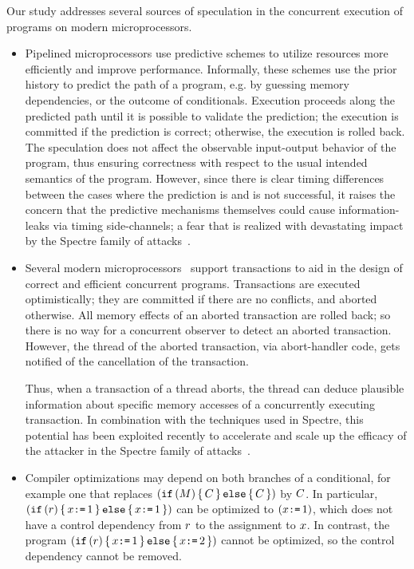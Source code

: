 Our study addresses several sources of speculation in the concurrent
execution of programs on modern microprocessors.
\begin{itemize}

\item Pipelined microprocessors use predictive schemes to utilize
  resources more efficiently and improve performance. Informally,
  these schemes use the prior history to predict the path of a
  program, e.g. by guessing memory dependencies, or the outcome of
  conditionals. Execution proceeds along the predicted path until it
  is possible to validate the prediction; the execution is committed
  if the prediction is correct; otherwise, the execution is rolled
  back.  The speculation does not affect the observable input-output
  behavior of the program, thus ensuring correctness with respect to
  the usual intended semantics of the program. However, since there is
  clear timing differences between the cases where the prediction is
  and is not successful, it raises the concern that the predictive
  mechanisms themselves could cause information-leaks via timing
  side-channels; a fear that is realized with devastating impact by
  the Spectre family of attacks~\cite{DBLP:journals/corr/abs-1801-01203}.

\item Several modern microprocessors~\cite{ChongSW18} support transactions
  to aid in the design of correct and efficient concurrent
  programs. Transactions are executed optimistically; they are
  committed if there are no conflicts, and aborted otherwise. All
  memory effects of an aborted transaction are rolled back; so there
  is no way for a concurrent observer to detect an aborted
  transaction.  However, the thread of the aborted transaction, via
  abort-handler code, gets notified of the cancellation of the
  transaction.

  Thus, when a transaction of a thread aborts, the thread can deduce
  plausible information about specific memory accesses of a
  concurrently executing transaction. In combination with the
  techniques used in Spectre, this potential has been exploited
  recently to accelerate and scale up the efficacy of the attacker in
  the Spectre family of attacks~\cite{DBLP:conf/uss/DisselkoenKPT17}.

\item Compiler optimizations may depend on both branches of
  a conditional, for example one that replaces
  $(\texttt{if}\,(M)\,\{\, C \,\}\,\texttt{else}\,\{\, C \,\})$ by $C$.
  In particular, $(\texttt{if}\,(r)\,\{\, x\texttt{:=}\,1 \,\}\,\texttt{else}\,\{\, x\texttt{:=}\,1 \,\})$
  can be optimized to $(x\texttt{:=}\,1)$, which does not have a control
  dependency from $r$ to the assignment to $x$.
  In contrast, the program $(\texttt{if}\,(r)\,\{\, x\texttt{:=}\,1 \,\}\,\texttt{else}\,\{\, x\texttt{:=}\,2 \,\})$
  cannot be optimized, so the control dependency cannot be removed.


\end{itemize}
